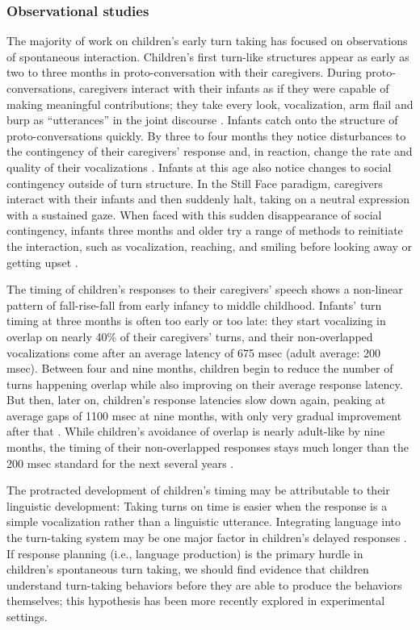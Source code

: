 \documentclass[authoryear, 12pt]{elsarticle}
\begin{document}
\subsubsection{Observational studies}

The majority of work on children's early turn taking has focused on observations of spontaneous interaction. Children's first turn-like structures appear as early as two to three months in proto-conversation with their caregivers. During proto-conversations, caregivers interact with their infants as if they were capable of making meaningful contributions; they take every look, vocalization, arm flail and burp as ``utterances'' in the joint discourse \citep{snow1977, jaffe2001}. Infants catch onto the structure of proto-conversations quickly. By three to four months they notice disturbances to the contingency of their caregivers' response and, in reaction, change the rate and quality of their vocalizations \citep{k-bloom1988, masataka1993}. Infants at this age also notice changes to social contingency outside of turn structure. In the Still Face paradigm, caregivers interact with their infants and then suddenly halt, taking on a neutral expression with a sustained gaze. When faced with this sudden disappearance of social contingency, infants three months and older try a range of methods to reinitiate the interaction, such as vocalization, reaching, and smiling before looking away or getting upset \citep{rochat1998, toda1993}.

The timing of children's responses to their caregivers' speech shows a non-linear pattern of fall-rise-fall from early infancy to middle childhood. Infants' turn timing at three months is often too early or too late: they start vocalizing in overlap on nearly 40\% of their caregivers' turns, and their non-overlapped vocalizations come after an average latency of 675 msec (adult average: 200 msec). Between four and nine months, children begin to reduce the number of turns happening overlap while also improving on their average response latency. But then, later on, children's response latencies slow down again, peaking at average gaps of 1100 msec at nine months, with only very gradual improvement after that \citep{hilbrinkInPrep}. While children's avoidance of overlap is nearly adult-like by nine months, the timing of their non-overlapped responses stays much longer than the 200 msec standard for the next several years \citep{ervin-tripp1979}.

The protracted development of children's timing may be attributable to their linguistic development: Taking turns on time is easier when the response is a simple vocalization rather than a linguistic utterance. Integrating language into the turn-taking system may be one major factor in children's delayed responses \citep{casillasUndRev}. If response planning (i.e., language production) is the primary hurdle in children's spontaneous turn taking, we should find evidence that children understand turn-taking behaviors before they are able to produce the behaviors themselves; this hypothesis has been more recently explored in experimental settings.
\end{document}
